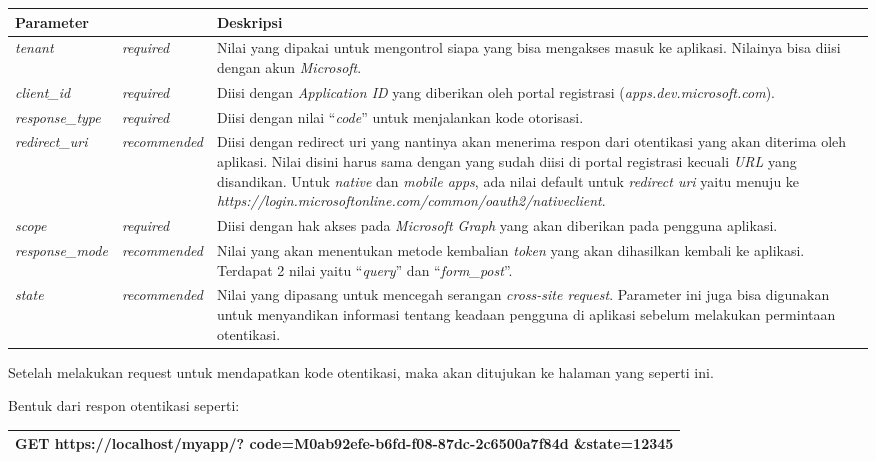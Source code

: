 \begin{description}
\begin{center}
	\begin{tabular}{|p{2.5cm}|p{2.5cm}|p{10cm}|}
		\hline
		\textbf{Parameter}& &\textbf{Deskripsi}\\ \hline
		\textit{tenant} & \textit{required} & Nilai yang dipakai untuk mengontrol siapa yang bisa mengakses masuk ke aplikasi. Nilainya bisa diisi dengan akun \textit{Microsoft}. \\ \hline
		 \textit{client\_id} & \textit{required} & Diisi dengan \textit{Application ID} yang diberikan oleh portal registrasi (\textit{apps.dev.microsoft.com}).\\ \hline
		 \textit{response\_type} & \textit{required} & Diisi dengan nilai ``\textit{code}'' untuk menjalankan kode otorisasi.\\ \hline
		 \textit{redirect\_uri} & \textit{recommended} & Diisi dengan redirect uri yang nantinya akan menerima respon dari otentikasi yang akan diterima oleh aplikasi. Nilai disini harus sama dengan yang sudah diisi di portal registrasi kecuali \textit{URL} yang disandikan. Untuk \textit{native} dan \textit{mobile apps}, ada nilai default untuk \textit{redirect uri} yaitu menuju ke \textit{https://login.microsoftonline.com/common/oauth2/nativeclient}.\\ \hline
		 \textit{scope} & \textit{required} & Diisi dengan hak akses pada \textit{Microsoft Graph} yang akan diberikan pada pengguna aplikasi. \\ \hline
		 \textit{response\_mode} & \textit{recommended} & Nilai yang akan menentukan metode kembalian \textit{token} yang akan dihasilkan kembali ke aplikasi. Terdapat 2 nilai yaitu ``\textit{query}'' dan ``\textit{form\_post}''. \\ \hline
		 \textit{state} & \textit{recommended} & Nilai yang dipasang untuk mencegah serangan \textit{cross-site request}. Parameter ini juga bisa digunakan untuk menyandikan informasi tentang keadaan pengguna di aplikasi sebelum melakukan permintaan otentikasi.\\
		 \hline		 
	\end{tabular}
\end{center}

Setelah melakukan request untuk mendapatkan kode otentikasi, maka akan ditujukan ke halaman yang seperti ini. 

Bentuk dari respon otentikasi seperti:

\begin{center}
	\begin{tabular}{|p{15cm}|}
		\hline
		GET https://localhost/myapp/?\newline
		code=M0ab92efe-b6fd-f08-87dc-2c6500a7f84d\newline
		\&state=12345\\ \hline
	\end{tabular}
\end{center}


\end{description}
